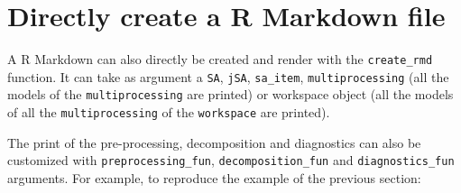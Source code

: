 \documentclass[
]{article}
\begin{document}
\hypertarget{directly-create-a-r-markdown-file}{%
\section{Directly create a R Markdown
file}\label{directly-create-a-r-markdown-file}}

A R Markdown can also directly be created and render with the
\texttt{create\_rmd} function. It can take as argument a \texttt{SA},
\texttt{jSA}, \texttt{sa\_item}, \texttt{multiprocessing} (all the
models of the \texttt{multiprocessing} are printed) or workspace object
(all the models of all the \texttt{multiprocessing} of the
\texttt{workspace} are printed).

The print of the pre-processing, decomposition and diagnostics can also
be customized with \texttt{preprocessing\_fun},
\texttt{decomposition\_fun} and \texttt{diagnostics\_fun} arguments. For
example, to reproduce the example of the previous section:
\end{document}
